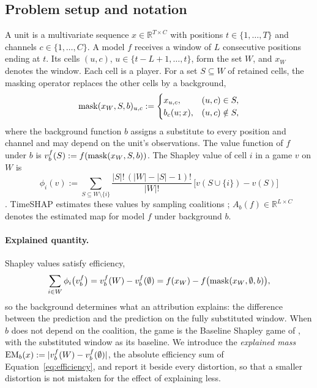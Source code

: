 \documentclass{article}
\begin{document}
\subsection{Problem setup and notation}\label{sec:method:setup}

A unit is a multivariate sequence $x\in\mathbb{R}^{T\times C}$ with positions $t\in\{1,\dots,T\}$ and channels $c\in\{1,\dots,C\}$. A model $f$ receives a window of $L$ consecutive positions ending at $t$. Its cells $(u,c)$, $u\in\{t-L+1,\dots,t\}$, form the set $W$, and $x_W$ denotes the window. Each cell is a player. For a set $S\subseteq W$ of retained cells, the masking operator replaces the other cells by a background,
\begin{equation}\label{eq:mask}
\operatorname{mask}(x_W,S,b)_{u,c} :=
\begin{cases}
x_{u,c}, & (u,c)\in S,\\
b_c(u;x), & (u,c)\notin S,
\end{cases}
\end{equation}
where the background function $b$ assigns a substitute to every position and channel and may depend on the unit's observations. The value function of $f$ under $b$ is $v^f_b(S) := f(\operatorname{mask}(x_W,S,b))$. The Shapley value of cell $i$ in a game $v$ on $W$ is
\begin{equation}\label{eq:shapley}
\phi_i(v) := \sum_{S\subseteq W\setminus\{i\}} \frac{|S|!\,(|W|-|S|-1)!}{|W|!}\,\bigl[v(S\cup\{i\})-v(S)\bigr]
\end{equation}
\citep{shapley1953value}. TimeSHAP estimates these values by sampling coalitions \citep{bento2021timeshap}; $A_b(f)\in\mathbb{R}^{L\times C}$ denotes the estimated map for model $f$ under background $b$.

\paragraph{Explained quantity.} Shapley values satisfy efficiency,
\begin{equation}\label{eq:efficiency}
\sum_{i\in W}\phi_i\bigl(v^f_b\bigr) = v^f_b(W)-v^f_b(\emptyset) = f(x_W) - f\bigl(\operatorname{mask}(x_W,\emptyset,b)\bigr),
\end{equation}
so the background determines what an attribution explains: the difference between the prediction and the prediction on the fully substituted window. When $b$ does not depend on the coalition, the game is the Baseline Shapley game of \citet{sundararajan2020many}, with the substituted window as its baseline. We introduce the \emph{explained mass} $\mathrm{EM}_b(x) := |v^f_b(W)-v^f_b(\emptyset)|$, the absolute efficiency sum of Equation~\eqref{eq:efficiency}, and report it beside every distortion, so that a smaller distortion is not mistaken for the effect of explaining less.
\end{document}
